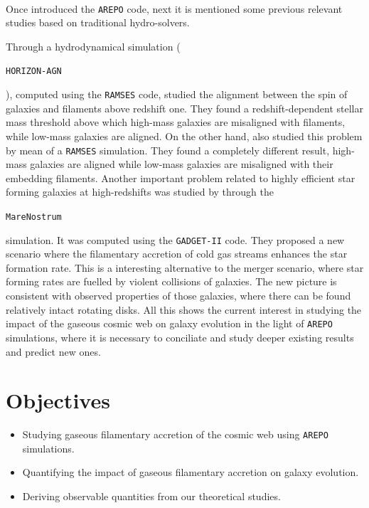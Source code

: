 \documentclass[a4,useAMS,usenatbib,usegraphicx,12pt]{article}
\begin{document}
\

Once introduced the \texttt{AREPO} code, next it is mentioned some previous 
relevant studies based on traditional hydro-solvers. 

Through a hydrodynamical 
simulation (\begin{footnotesize}\texttt{HORIZON-AGN}\end{footnotesize}), 
computed using the \texttt{RAMSES} code, \citet{Dubois14} studied the alignment 
between the spin of galaxies and filaments above redshift one. They found a 
redshift-dependent stellar mass threshold above which high-mass galaxies are 
misaligned with filaments, while low-mass galaxies are aligned. On the other 
hand, \citet{Hahn10} also studied this problem by mean of a \texttt{RAMSES} 
simulation. They found a completely different result, high-mass galaxies are 
aligned while low-mass galaxies are misaligned with their embedding filaments. 
Another important problem related to highly efficient star forming galaxies at 
high-redshifts was studied by \citet{Dekel09} through the 
\begin{footnotesize}\texttt{MareNostrum}\end{footnotesize} simulation. It was 
computed using the \texttt{GADGET-II} code. They proposed a new scenario where 
the filamentary accretion of cold gas streams enhances the star formation rate. 
This is a interesting alternative to the merger scenario, where star forming 
rates are fuelled by violent collisions of galaxies. The new picture is 
consistent with observed properties of those galaxies, where there can be found 
relatively intact rotating disks. All this shows the current interest in 
studying the impact of the gaseous cosmic web on galaxy evolution in the light 
of \texttt{AREPO} simulations, where it is necessary to conciliate and study 
deeper existing results and predict new ones.




\section{Objectives}


\begin{itemize}

\item[\checkmark] Studying gaseous filamentary accretion of the cosmic web using 
\texttt{AREPO} simulations.

\item[\checkmark] Quantifying the impact of gaseous filamentary accretion on 
galaxy evolution.

\item[\checkmark] Deriving observable quantities from our theoretical studies.


\end{itemize}
\end{document}

